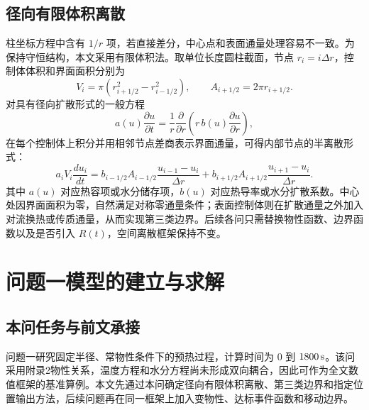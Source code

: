 \documentclass[UTF8,a4paper,12pt]{ctexart}
\numberwithin{equation}{section}
\begin{document}
\subsection{径向有限体积离散}
柱坐标方程中含有 $1/r$ 项，若直接差分，中心点和表面通量处理容易不一致。为保持守恒结构，本文采用有限体积法。取单位长度圆柱截面，节点 $r_i=i\Delta r$，控制体体积和界面面积分别为
\begin{equation}
  V_i=\pi\left(r_{i+1/2}^2-r_{i-1/2}^2\right),\qquad
  A_{i+1/2}=2\pi r_{i+1/2}.
\end{equation}
对具有径向扩散形式的一般方程
\begin{equation}
  a(u)\frac{\partial u}{\partial t}
  =\frac1r\frac{\partial}{\partial r}\left(r\,b(u)\frac{\partial u}{\partial r}\right),
\end{equation}
在每个控制体上积分并用相邻节点差商表示界面通量，可得内部节点的半离散形式：
\begin{equation}
  a_iV_i\frac{du_i}{dt}
  =b_{i-1/2}A_{i-1/2}\frac{u_{i-1}-u_i}{\Delta r}
  +b_{i+1/2}A_{i+1/2}\frac{u_{i+1}-u_i}{\Delta r}.
\end{equation}
其中 $a(u)$ 对应热容项或水分储存项，$b(u)$ 对应热导率或水分扩散系数。中心处因界面面积为零，自然满足对称零通量条件；表面控制体则在扩散通量之外加入对流换热或传质通量，从而实现第三类边界。后续各问只需替换物性函数、边界函数以及是否引入 $R(t)$，空间离散框架保持不变。

\section{问题一模型的建立与求解}
\subsection{本问任务与前文承接}
问题一研究固定半径、常物性条件下的预热过程，计算时间为 $0$ 到 $1800\rm\,s$。该问采用附录2物性关系，温度方程和水分方程尚未形成双向耦合，因此可作为全文数值框架的基准算例。本文先通过本问确定径向有限体积离散、第三类边界和指定位置输出方法，后续问题再在同一框架上加入变物性、达标事件函数和移动边界。
\end{document}
